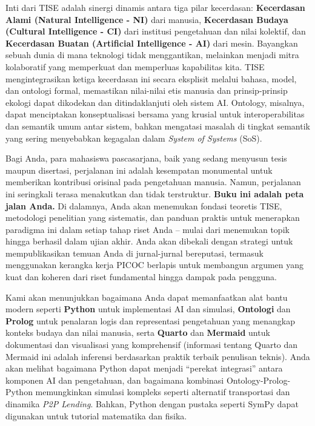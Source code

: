 \documentclass[
  letterpaper,
  DIV=11,
  numbers=noendperiod]{scrreprt}
\begin{document}
Inti dari TISE adalah sinergi dinamis antara tiga pilar kecerdasan:
\textbf{Kecerdasan Alami (Natural Intelligence - NI)} dari manusia,
\textbf{Kecerdasan Budaya (Cultural Intelligence - CI)} dari institusi
pengetahuan dan nilai kolektif, dan \textbf{Kecerdasan Buatan
(Artificial Intelligence - AI)} dari mesin. Bayangkan sebuah dunia di
mana teknologi tidak menggantikan, melainkan menjadi mitra kolaboratif
yang memperkuat dan memperluas kapabilitas kita. TISE mengintegrasikan
ketiga kecerdasan ini secara eksplisit melalui bahasa, model, dan
ontologi formal, memastikan nilai-nilai etis manusia dan prinsip-prinsip
ekologi dapat dikodekan dan ditindaklanjuti oleh sistem AI. Ontology,
misalnya, dapat menciptakan konseptualisasi bersama yang krusial untuk
interoperabilitas dan semantik umum antar sistem, bahkan mengatasi
masalah di tingkat semantik yang sering menyebabkan kegagalan dalam
\emph{System of Systems} (SoS).

Bagi Anda, para mahasiswa pascasarjana, baik yang sedang menyusun tesis
maupun disertasi, perjalanan ini adalah kesempatan monumental untuk
memberikan kontribusi orisinal pada pengetahuan manusia. Namun,
perjalanan ini seringkali terasa menakutkan dan tidak terstruktur.
\textbf{Buku ini adalah peta jalan Anda.} Di dalamnya, Anda akan
menemukan fondasi teoretis TISE, metodologi penelitian yang sistematis,
dan panduan praktis untuk menerapkan paradigma ini dalam setiap tahap
riset Anda -- mulai dari menemukan topik hingga berhasil dalam ujian
akhir. Anda akan dibekali dengan strategi untuk mempublikasikan temuan
Anda di jurnal-jurnal bereputasi, termasuk menggunakan kerangka kerja
PICOC berlapis untuk membangun argumen yang kuat dan koheren dari riset
fundamental hingga dampak pada pengguna.

Kami akan menunjukkan bagaimana Anda dapat memanfaatkan alat bantu
modern seperti \textbf{Python} untuk implementasi AI dan simulasi,
\textbf{Ontologi} dan \textbf{Prolog} untuk penalaran logis dan
representasi pengetahuan yang menangkap konteks budaya dan nilai
manusia, serta \textbf{Quarto} dan \textbf{Mermaid} untuk dokumentasi
dan visualisasi yang komprehensif (informasi tentang Quarto dan Mermaid
ini adalah inferensi berdasarkan praktik terbaik penulisan teknis). Anda
akan melihat bagaimana Python dapat menjadi ``perekat integrasi'' antara
komponen AI dan pengetahuan, dan bagaimana kombinasi
Ontology-Prolog-Python memungkinkan simulasi kompleks seperti alternatif
transportasi dan dinamika \emph{P2P Lending}. Bahkan, Python dengan
pustaka seperti SymPy dapat digunakan untuk tutorial matematika dan
fisika.
\end{document}
